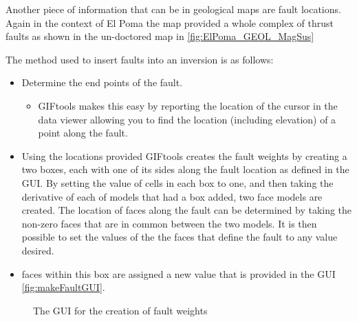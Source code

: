 Another piece of information that can be in geological maps are fault locations. Again in the context of El Poma the map provided a whole complex of thrust faults as shown in the un-doctored map in \autoref{fig:ElPoma_GEOL_MagSus}

The method used to insert faults into an inversion is as follows:

\begin{itemize}
\item Determine the end points of the fault.
\begin{itemize}
	\item GIFtools makes this easy by reporting the location of the cursor in the data viewer allowing you to find the location (including elevation) of a point along the fault.
\end{itemize}
\item Using the locations provided GIFtools creates the fault weights by creating a two boxes, each with one of its sides along the fault location as defined in the \ac{GUI}. By setting the value of cells in each box to one, and then taking the derivative of each of models that had a box added, two face models are created. The location of faces along the fault can be determined by taking the non-zero faces that are in common between the two models.  It is then possible to set the values of the the faces that define the fault to any value desired.

\item faces within this box are assigned a new value that is provided in the GUI \autoref{fig:makeFaultGUI}.
\end{itemize}

\begin{figure} [h]
    \centering
    \caption{The GUI for the creation of fault weights}
    \label{fig:makeFaultGUI}
\end{figure}

